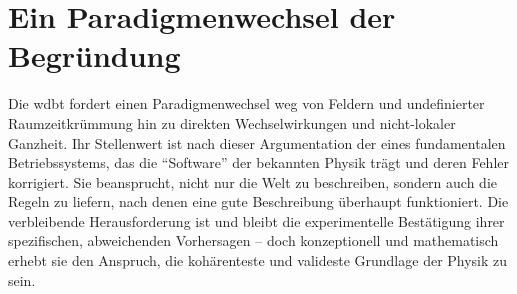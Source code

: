 \section{Ein Paradigmenwechsel der Begründung}
Die \gls{wdbt} fordert einen Paradigmenwechsel weg von Feldern und undefinierter Raumzeitkrümmung hin zu direkten Wechselwirkungen und nicht-lokaler Ganzheit. Ihr Stellenwert ist nach dieser
Argumentation der eines fundamentalen Betriebssystems, das die \enquote{Software} der bekannten Physik trägt und deren Fehler korrigiert. Sie beansprucht, nicht nur die Welt zu beschreiben, sondern
auch die Regeln zu liefern, nach denen eine gute Beschreibung überhaupt funktioniert. Die verbleibende Herausforderung ist und bleibt die experimentelle Bestätigung ihrer spezifischen, abweichenden
Vorhersagen – doch konzeptionell und mathematisch erhebt sie den Anspruch, die kohärenteste und valideste Grundlage der Physik zu sein.
